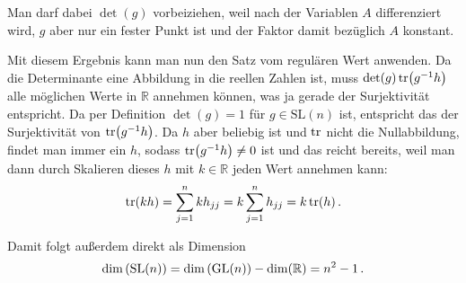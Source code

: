\documentclass[../H_Analysis_main.tex]{subfiles}
\begin{document}
\begin{bsp}
Man darf dabei $\det(g)$ vorbeiziehen, weil nach der Variablen $A$ differenziert wird, $g$ aber nur ein fester Punkt ist und der Faktor damit bezüglich $A$ konstant.

Mit diesem Ergebnis kann man nun den Satz vom regulären Wert anwenden. Da die Determinante eine Abbildung in die reellen Zahlen ist, muss $\det(g) \tr(g^{-1} h)$ alle möglichen Werte in $\mathbb{R}$ annehmen können, was ja gerade der Surjektivität entspricht. Da per Definition $\det(g) = 1$ für $g \in \text{SL}(n)$ ist, entspricht das der Surjektivität von $\tr(g^{-1} h)$. Da $h$ aber beliebig ist und $\tr$ nicht die Nullabbildung, findet man immer ein $h$, sodass $\tr(g^{-1} h) \neq 0$ ist und das reicht bereits, weil man dann durch Skalieren dieses $h$ mit $k \in \mathbb{R}$ jeden Wert annehmen kann:
\begin{equation*}
\tr(k h) = \sum_{j = 1}^n k h_{jj} = k \sum_{j = 1}^n h_{jj} = k \tr(h) \, .
\end{equation*}

Damit folgt außerdem direkt als Dimension
\begin{equation}
\dim\qty(\text{SL}(n)) = \dim\qty(\text{GL}(n)) - \dim(\mathbb{R}) = n^2 - 1 \, .
\end{equation}
\end{bsp}
\end{document}
